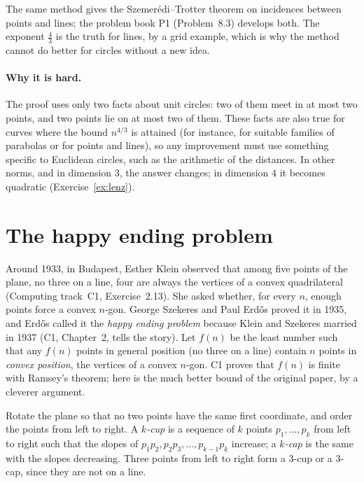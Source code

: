 The same method gives the Szemer\'edi--Trotter theorem on incidences between points and lines; the problem book P1 (Problem~8.3) develops both. The
exponent $\frac43$ is the truth for lines, by a grid example, which is why the method cannot do better for circles without a new idea.

\paragraph{Why it is hard.} The proof uses only two facts about unit circles: two of them meet in at most two points, and two points lie on at most two of
them. These facts are also true for curves where the bound $n^{4/3}$ is attained (for instance, for suitable families of parabolas or for points and
lines), so any improvement must use something specific to Euclidean circles, such as the arithmetic of the distances. In other norms, and in dimension
$3$, the answer changes; in dimension $4$ it becomes quadratic (Exercise~\ref{ex:lenz}).

\section{The happy ending problem}

Around 1933, in Budapest, Esther Klein observed that among five points of the plane, no three on a line, four are always the vertices of a
convex quadrilateral (Computing track~C1, Exercise~2.13). She asked whether, for every $n$, enough points force a convex $n$-gon. George Szekeres and
Paul Erd\H os proved it in 1935, and Erd\H os called it the \emph{happy ending problem} because Klein and Szekeres married in 1937 (C1, Chapter~2, tells the story). Let $f(n)$ be the least
number such that any $f(n)$ points in general position (no three on a line) contain $n$ points in \emph{convex position}, the vertices of a convex
$n$-gon. C1 proves that $f(n)$ is finite with Ramsey's theorem; here is the much better bound of the original paper, by a cleverer argument.

Rotate the plane so that no two points have the same first coordinate, and order the points from left to right. A \emph{$k$-cup} is a sequence of $k$
points $p_1,\dots,p_k$ from left to right such that the slopes of $p_1p_2,p_2p_3,\dots,p_{k-1}p_k$ increase; a \emph{$k$-cap} is the same with the slopes
decreasing. Three points from left to right form a $3$-cup or a $3$-cap, since they are not on a line.

